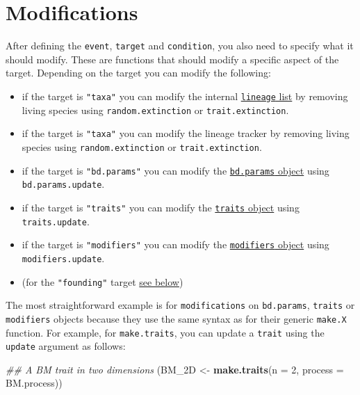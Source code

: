 \documentclass[
]{book}
\newenvironment{Shaded}{\begin{snugshade}}{\end{snugshade}}
\newcommand{\CommentTok}[1]{\textcolor[rgb]{0.56,0.35,0.01}{\textit{#1}}}
\newcommand{\DataTypeTok}[1]{\textcolor[rgb]{0.13,0.29,0.53}{#1}}
\newcommand{\DecValTok}[1]{\textcolor[rgb]{0.00,0.00,0.81}{#1}}
\newcommand{\KeywordTok}[1]{\textcolor[rgb]{0.13,0.29,0.53}{\textbf{#1}}}
\newcommand{\NormalTok}[1]{#1}
\newcommand{\StringTok}[1]{\textcolor[rgb]{0.31,0.60,0.02}{#1}}
\providecommand{\tightlist}{%
  \setlength{\itemsep}{0pt}\setlength{\parskip}{0pt}}
\begin{document}
\hypertarget{modifications}{%
\section{Modifications}\label{modifications}}

After defining the \texttt{event}, \texttt{target} and \texttt{condition}, you also need to specify what it should modify.
These are functions that should modify a specific aspect of the target.
Depending on the target you can modify the following:

\begin{itemize}
\tightlist
\item
  if the target is \texttt{"taxa"} you can modify the internal \protect\hyperlink{allowarguments}{\texttt{lineage} list} by removing living species using \texttt{random.extinction} or \texttt{trait.extinction}.
\item
  if the target is \texttt{"taxa"} you can modify the lineage tracker by removing living species using \texttt{random.extinction} or \texttt{trait.extinction}.
\item
  if the target is \texttt{"bd.params"} you can modify the \protect\hyperlink{makebdparams}{\texttt{bd.params} object} using \texttt{bd.params.update}.
\item
  if the target is \texttt{"traits"} you can modify the \protect\hyperlink{maketraits}{\texttt{traits} object} using \texttt{traits.update}.
\item
  if the target is \texttt{"modifiers"} you can modify the \protect\hyperlink{makemodifiers}{\texttt{modifiers} object} using \texttt{modifiers.update}.
\item
  (for the \texttt{"founding"} target \protect\hyperlink{founding}{see below})
\end{itemize}

The most straightforward example is for \texttt{modifications} on \texttt{bd.params}, \texttt{traits} or \texttt{modifiers} objects because they use the same syntax as for their generic \texttt{make.X} function.
For example, for \texttt{make.traits}, you can update a \texttt{trait} using the \texttt{update} argument as follows:

\begin{Shaded}
\begin{Highlighting}[]
\CommentTok{\#\# A BM trait in two dimensions}
\NormalTok{(BM\_2D \textless{}{-}}\StringTok{ }\KeywordTok{make.traits}\NormalTok{(}\DataTypeTok{n =} \DecValTok{2}\NormalTok{, }\DataTypeTok{process =}\NormalTok{ BM.process))}
\end{Highlighting}
\end{Shaded}
\end{document}
